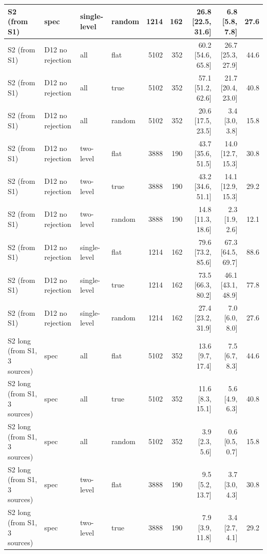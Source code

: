 \begin{tabular}{llllrrrrr}
S2 (from S1) & spec & single-level & random & 1214 & 162 & 26.8 \scriptsize{[22.5, 31.6]} & 6.8 \scriptsize{[5.8, 7.8]} & 27.6 \\
\midrule
S2 (from S1) & D12 no rejection & all & flat & 5102 & 352 & 60.2 \scriptsize{[54.6, 65.8]} & 26.7 \scriptsize{[25.3, 27.9]} & 44.6 \\
S2 (from S1) & D12 no rejection & all & true & 5102 & 352 & 57.1 \scriptsize{[51.2, 62.6]} & 21.7 \scriptsize{[20.4, 23.0]} & 40.8 \\
S2 (from S1) & D12 no rejection & all & random & 5102 & 352 & 20.6 \scriptsize{[17.5, 23.5]} & 3.4 \scriptsize{[3.0, 3.8]} & 15.8 \\
S2 (from S1) & D12 no rejection & two-level & flat & 3888 & 190 & 43.7 \scriptsize{[35.6, 51.5]} & 14.0 \scriptsize{[12.7, 15.3]} & 30.8 \\
S2 (from S1) & D12 no rejection & two-level & true & 3888 & 190 & 43.2 \scriptsize{[34.6, 51.1]} & 14.1 \scriptsize{[12.9, 15.3]} & 29.2 \\
S2 (from S1) & D12 no rejection & two-level & random & 3888 & 190 & 14.8 \scriptsize{[11.3, 18.6]} & 2.3 \scriptsize{[1.9, 2.6]} & 12.1 \\
S2 (from S1) & D12 no rejection & single-level & flat & 1214 & 162 & 79.6 \scriptsize{[73.2, 85.6]} & 67.3 \scriptsize{[64.5, 69.7]} & 88.6 \\
S2 (from S1) & D12 no rejection & single-level & true & 1214 & 162 & 73.5 \scriptsize{[66.3, 80.2]} & 46.1 \scriptsize{[43.1, 48.9]} & 77.8 \\
S2 (from S1) & D12 no rejection & single-level & random & 1214 & 162 & 27.4 \scriptsize{[23.2, 31.9]} & 7.0 \scriptsize{[6.0, 8.0]} & 27.6 \\
\midrule
S2 long (from S1, 3 sources) & spec & all & flat & 5102 & 352 & 13.6 \scriptsize{[9.7, 17.4]} & 7.5 \scriptsize{[6.7, 8.3]} & 44.6 \\
S2 long (from S1, 3 sources) & spec & all & true & 5102 & 352 & 11.6 \scriptsize{[8.3, 15.1]} & 5.6 \scriptsize{[4.9, 6.3]} & 40.8 \\
S2 long (from S1, 3 sources) & spec & all & random & 5102 & 352 & 3.9 \scriptsize{[2.3, 5.6]} & 0.6 \scriptsize{[0.5, 0.7]} & 15.8 \\
S2 long (from S1, 3 sources) & spec & two-level & flat & 3888 & 190 & 9.5 \scriptsize{[5.2, 13.7]} & 3.7 \scriptsize{[3.0, 4.3]} & 30.8 \\
S2 long (from S1, 3 sources) & spec & two-level & true & 3888 & 190 & 7.9 \scriptsize{[3.9, 11.8]} & 3.4 \scriptsize{[2.7, 4.1]} & 29.2 \\

\end{tabular}
